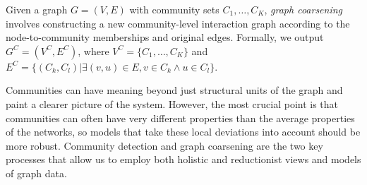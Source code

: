 \begin{definition}
    Given a graph $G=(V,E)$ with community sets $C_1, \dots, C_K$, \emph{graph coarsening} involves constructing a new community-level interaction graph according to the node-to-community memberships and original edges. Formally, we output $G^C=(V^C,E^C)$, where $V^C=\{C_1,\dots,C_K\}$ and $E^C=\{(C_k,C_l)|\exists (v,u) \in E,v \in C_k \wedge u \in C_l\}$.
\end{definition}

Communities can have meaning beyond just structural units of the graph and paint a clearer picture of the system. However, the most crucial point is that communities can often have very different properties than the average properties of the networks, so models that take these local deviations into account should be more robust. Community detection and graph coarsening are the two key processes that allow us to employ both holistic and reductionist views and models of graph data.






